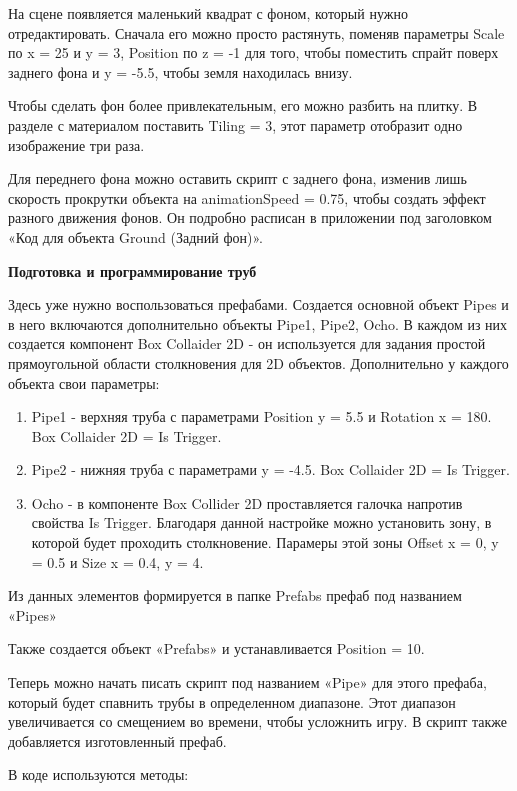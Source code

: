 \documentclass[14pt, oneside]{altsu-report}
\begin{document}
На сцене появляется маленький квадрат с фоном, который нужно отредактировать. Сначала его можно просто растянуть, поменяв параметры Scale по x = 25 и y = 3, Position по z = -1 для того, чтобы поместить спрайт поверх заднего фона и y = -5.5, чтобы земля находилась внизу. 

Чтобы сделать фон более привлекательным, его можно разбить на плитку. В разделе с материалом поставить Tiling = 3, этот параметр отобразит одно изображение три раза.  

Для переднего фона можно оставить скрипт с заднего фона, изменив лишь скорость прокрутки объекта на animationSpeed = 0.75, чтобы создать эффект разного движения фонов. Он подробно расписан в приложении под заголовком «Код для объекта Ground (Задний фон)».

\textbf{Подготовка и программирование труб}

Здесь уже нужно воспользоваться префабами. Создается основной объект Pipes и в него включаются дополнительно объекты Pipe1, Pipe2, Ocho. В каждом из них создается компонент Box Collaider 2D - он используется для задания простой прямоугольной области столкновения для 2D объектов. Дополнительно у каждого объекта свои параметры: 

\begin{enumerate}
\item Pipe1 - верхняя труба с параметрами Position y = 5.5 и Rotation x = 180. Box Collaider 2D = Is Trigger.
\item Pipe2 - нижняя труба с параметрами  y = -4.5. Box Collaider 2D = Is Trigger.
\item Ocho - в компоненте Box Collider 2D проставляется галочка напротив свойства Is Trigger. Благодаря данной настройке можно установить зону, в которой будет проходить столкновение. Парамеры этой зоны Offset x = 0, y = 0.5 и Size x = 0.4, y = 4.
\end{enumerate} 

Из данных элементов формируется в папке Prefabs префаб под названием «Pipes»

Также создается объект «Prefabs» и устанавливается Position = 10.

Теперь можно начать писать скрипт под названием «Pipe» для этого префаба, который будет спавнить трубы в определенном диапазоне. Этот диапазон увеличивается со смещением во времени, чтобы усложнить игру. В скрипт также добавляется изготовленный префаб. 

В коде используются методы:
\end{document}
